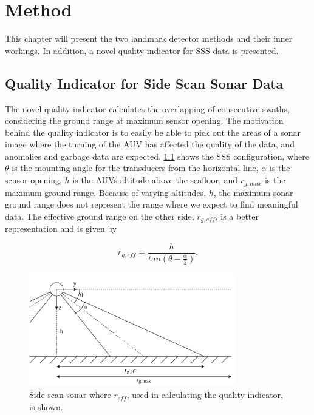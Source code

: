 \chapter{Method}

This chapter will present the two landmark detector methods and their inner workings. In addition, a novel quality indicator for SSS data is presented.

\section{Quality Indicator for Side Scan Sonar Data}

The novel quality indicator calculates the overlapping of consecutive swaths, considering the ground range at maximum sensor opening. The motivation behind the quality indicator is to easily be able to pick out the areas of a sonar image where the turning of the AUV has affected the quality of the data, and anomalies and garbage data are expected. \cref{fig:r_eff} shows the SSS configuration, where $\theta$ is the mounting angle for the transducers from the horizontal line, $\alpha$ is the sensor opening, $h$ is the AUVs altitude above the seafloor, and $r_{g, max}$ is the maximum ground range. Because of varying altitudes, $h$, the maximum sonar ground range does not represent the range where we expect to find meaningful data. The effective ground range on the other side, $r_{g, eff}$, is a better representation and is given by

\begin{equation}
    r_{g,eff} = \frac{h}{tan(\theta - \frac{\alpha}{2})}.
    \label{eq:r_g_eff}
\end{equation}

\begin{figure}
    \centering
    \includegraphics[width=0.8\textwidth]{figures/r_eff.drawio.pdf}
    \caption{Side scan sonar where $r_{eff}$, used in calculating the quality indicator, is shown.}
    \label{fig:r_eff}
\end{figure}


